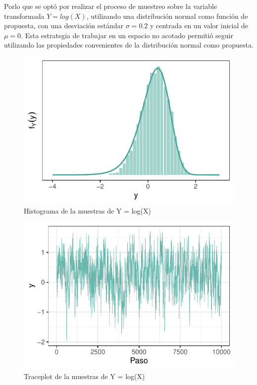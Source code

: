 \documentclass[
]{article}
\begin{document}
Porlo que se optó por realizar el proceso de muestreo sobre la variable
transformada \(Y=log(X)\), utilizando una distribución normal como función
de propuesta, con una desviación estándar \(\sigma = 0.2\) y centrada en
un valor inicial de \(\mu = 0\). Esta estrategia de trabajar en un espacio
no acotado permitió seguir utilizando las propiedades convenientes de la
distribución normal como propuesta.

\begin{figure}

{\centering \includegraphics{TP-2---El-Dibu-de-la-vida_files/figure-latex/f3-1} 

}

\caption{Histograma de la muestras de Y = log(X)}\label{fig:f3}
\end{figure}

\begin{figure}

{\centering \includegraphics{TP-2---El-Dibu-de-la-vida_files/figure-latex/f4-1} 

}

\caption{Traceplot de la muestras de Y = log(X)}\label{fig:f4}
\end{figure}
\end{document}
